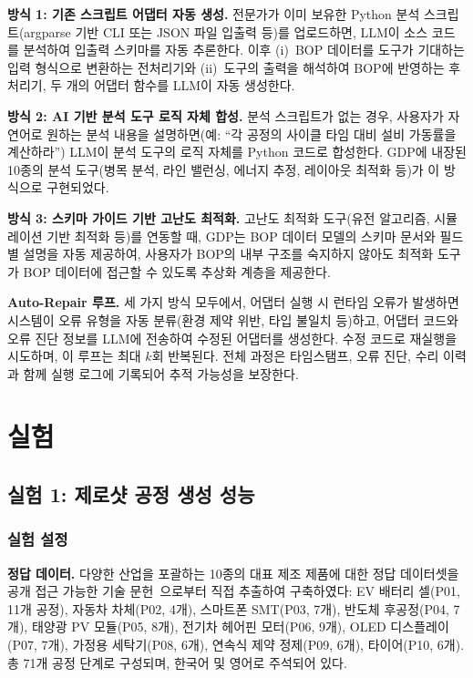 \textbf{방식 1: 기존 스크립트 어댑터 자동 생성.}
전문가가 이미 보유한 Python 분석 스크립트(argparse 기반 CLI 또는 JSON 파일 입출력 등)를 업로드하면, LLM이 소스 코드를 분석하여 입출력 스키마를 자동 추론한다. 이후 (i)~BOP 데이터를 도구가 기대하는 입력 형식으로 변환하는 전처리기와 (ii)~도구의 출력을 해석하여 BOP에 반영하는 후처리기, 두 개의 어댑터 함수를 LLM이 자동 생성한다.

\textbf{방식 2: AI 기반 분석 도구 로직 자체 합성.}
분석 스크립트가 없는 경우, 사용자가 자연어로 원하는 분석 내용을 설명하면(예: ``각 공정의 사이클 타임 대비 설비 가동률을 계산하라'') LLM이 분석 도구의 로직 자체를 Python 코드로 합성한다. GDP에 내장된 10종의 분석 도구(병목 분석, 라인 밸런싱, 에너지 추정, 레이아웃 최적화 등)가 이 방식으로 구현되었다.

\textbf{방식 3: 스키마 가이드 기반 고난도 최적화.}
고난도 최적화 도구(유전 알고리즘, 시뮬레이션 기반 최적화 등)를 연동할 때, GDP는 BOP 데이터 모델의 스키마 문서와 필드별 설명을 자동 제공하여, 사용자가 BOP의 내부 구조를 숙지하지 않아도 최적화 도구가 BOP 데이터에 접근할 수 있도록 추상화 계층을 제공한다.

\textbf{Auto-Repair 루프.}
세 가지 방식 모두에서, 어댑터 실행 시 런타임 오류가 발생하면 시스템이 오류 유형을 자동 분류(환경 제약 위반, 타입 불일치 등)하고, 어댑터 코드와 오류 진단 정보를 LLM에 전송하여 수정된 어댑터를 생성한다. 수정 코드로 재실행을 시도하며, 이 루프는 최대 $k$회 반복된다. 전체 과정은 타임스탬프, 오류 진단, 수리 이력과 함께 실행 로그에 기록되어 추적 가능성을 보장한다.

\section{실험}
\label{sec:experiments}

\subsection{실험 1: 제로샷 공정 생성 성능}

\subsubsection{실험 설정}

\textbf{정답 데이터.}
다양한 산업을 포괄하는 10종의 대표 제조 제품에 대한 정답 데이터셋을 공개 접근 가능한 기술 문헌~\cite{b15,b16,b17,b18,b19,b20,b21,b22,b23,b24}으로부터 직접 추출하여 구축하였다: EV 배터리 셀(P01, 11개 공정), 자동차 차체(P02, 4개), 스마트폰 SMT(P03, 7개), 반도체 후공정(P04, 7개), 태양광 PV 모듈(P05, 8개), 전기차 헤어핀 모터(P06, 9개), OLED 디스플레이(P07, 7개), 가정용 세탁기(P08, 6개), 연속식 제약 정제(P09, 6개), 타이어(P10, 6개). 총 71개 공정 단계로 구성되며, 한국어 및 영어로 주석되어 있다.

